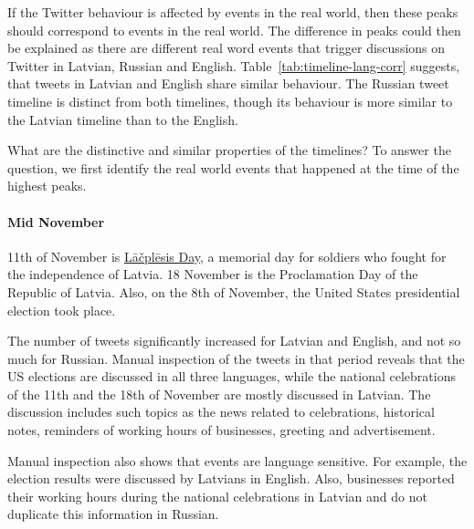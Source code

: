 \documentclass[11pt,a4paper]{article}
\begin{document}
If the Twitter behaviour is affected by events in the real world, then these peaks should correspond to events in the real world. The difference in peaks could then be explained as there are different real word events that trigger discussions on Twitter in Latvian, Russian and English. Table~\ref{tab:timeline-lang-corr} suggests, that tweets in Latvian and English share similar behaviour. The Russian tweet timeline is distinct from both timelines, though its behaviour is more similar to the Latvian timeline than to the English.


What are the distinctive and similar properties of the timelines? To answer the question, we first identify the real world events that happened at the time of the highest peaks.

\paragraph{Mid November}

11th of November is \href{https://en.wikipedia.org/wiki/L\%C4\%81\%C4\%8Dpl\%C4\%93sis_Day}{L\={a}\v{c}pl\={e}sis Day}, a memorial day for soldiers who fought for the independence of Latvia. 18 November is the Proclamation Day of the Republic of Latvia. Also, on the 8th of November, the 
United States presidential election took place.

The number of tweets significantly increased for Latvian and English, and not so much for Russian. Manual inspection of the tweets in that period reveals that the US elections are discussed in all three languages, while the national celebrations of the 11th and the 18th of November are mostly discussed in Latvian. The discussion includes such topics as the news related to celebrations, historical notes, reminders of working hours of businesses, greeting and advertisement.

Manual inspection also shows that events are language sensitive. For example, the election results were discussed by Latvians in English. Also, businesses reported their working hours during the national celebrations in Latvian and do not duplicate this information in Russian.
\end{document}
